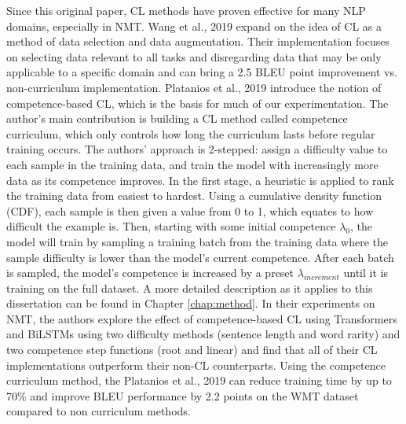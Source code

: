 Since this original paper, CL methods have proven effective for many NLP domains, especially in NMT. Wang et al., 2019 \cite{Wang2019LearningAM} expand on the idea of CL as a method of data selection and data augmentation. Their implementation focuses on selecting data relevant to all tasks and disregarding data that may be only applicable to a specific domain and can bring a 2.5 BLEU point improvement vs. non-curriculum implementation. Platanios et al., 2019 \cite{Platanios2019CompetencebasedCL} introduce the notion of competence-based CL, which is the basis for much of our experimentation. The author's main contribution is building a CL method called competence curriculum, which only controls how long the curriculum lasts before regular training occurs. The authors' approach is 2-stepped: assign a difficulty value to each sample in the training data, and train the model with increasingly more data as its competence improves. In the first stage, a heuristic is applied to rank the training data from easiest to hardest. Using a cumulative density function (CDF), each sample is then given a value from 0 to 1, which equates to how difficult the example is. Then, starting with some initial competence $\lambda_0$, the model will train by sampling a training batch from the training data where the sample difficulty is lower than the model's current competence. After each batch is sampled, the model's competence is increased by a preset $\lambda_{increment}$ until it is training on the full dataset. A more detailed description as it applies to this dissertation can be found in Chapter \ref{chap:method}. In their experiments on NMT, the authors explore the effect of competence-based CL using Transformers and BiLSTMs using two difficulty methods (sentence length and word rarity) and two competence step functions (root and linear) and find that all of their CL implementations outperform their non-CL counterparts. Using the competence curriculum method, the Platanios et al., 2019 can reduce training time by up to 70\% and improve BLEU performance by 2.2 points on the WMT dataset compared to non curriculum methods. 